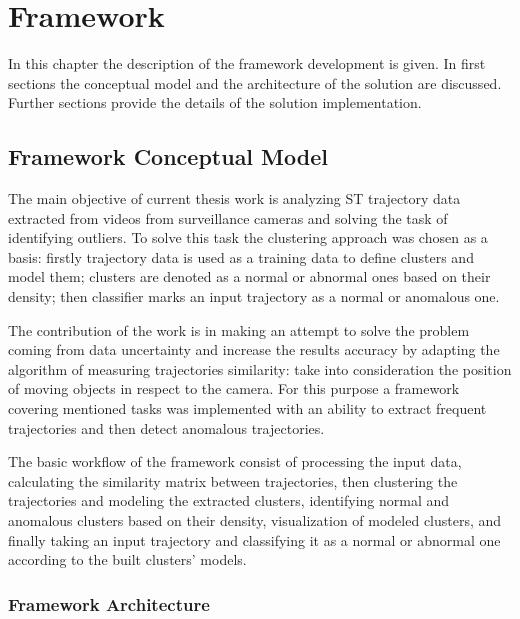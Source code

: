 \chapter{Framework}
\label{ch:Framework}

In this chapter the description of the framework development is given. In first sections the conceptual model and the architecture of the solution are discussed. Further sections provide the details of the solution implementation.

\section{Framework Conceptual Model}

The main objective of current thesis work is analyzing ST trajectory data extracted from videos from surveillance cameras and solving the task of identifying outliers. To solve this task the clustering approach was chosen as a basis: firstly trajectory data is used as a training data to define clusters and model them; clusters are denoted as a normal or abnormal ones based on their density; then classifier marks an input trajectory as a normal or anomalous one. 

The contribution of the work is in making an attempt to solve the problem coming from data uncertainty and increase the results accuracy by adapting the algorithm of measuring trajectories similarity:  take into consideration the position of moving objects in respect to the camera. For this purpose a framework covering mentioned tasks was implemented with an ability to extract frequent trajectories and then detect anomalous trajectories.

The basic workflow of the framework consist of processing the input data, calculating the similarity matrix between trajectories, then clustering the trajectories and modeling the extracted clusters, identifying normal and anomalous clusters based on their density, visualization of modeled clusters, and finally taking an input trajectory and classifying it as a normal or abnormal one according to the built clusters' models.

\subsection{Framework Architecture}

